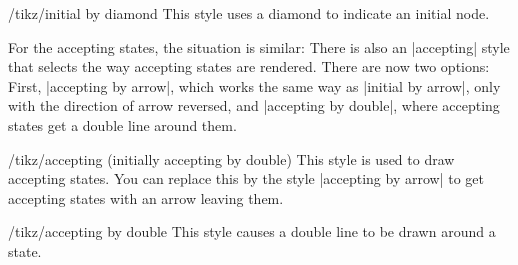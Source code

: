\begin{stylekey}{/tikz/initial by diamond}
  This style uses a diamond to indicate an initial node.
\end{stylekey}

For the accepting states, the situation is similar: There is also an
|accepting| style that selects the way accepting states are
rendered. There are now two options: First,
|accepting by arrow|, which works the same way as |initial by arrow|,
only with the direction of arrow reversed, and |accepting by double|,
where accepting states get a double line around them.

\begin{stylekey}{/tikz/accepting (initially accepting by double)}
  This style is used to draw accepting states.  You can replace
  this by the style |accepting by arrow| to get accepting states with
  an arrow leaving them.
\end{stylekey}

\begin{stylekey}{/tikz/accepting by double}
  This style causes a double line to be drawn around a state.
\end{stylekey}

